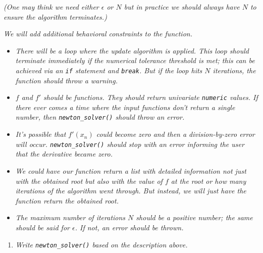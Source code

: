 \documentclass[
]{article}
\providecommand{\tightlist}{%
  \setlength{\itemsep}{0pt}\setlength{\parskip}{0pt}}
\begin{document}
\emph{(One may think we need either \(\epsilon\) or \(N\) but in
practice we should always have \(N\) to ensure the algorithm
terminates.)}

\emph{We will add additional behavioral constraints to the function.}

\begin{itemize}
\tightlist
\item
  \emph{There will be a loop where the update algorithm is applied. This
  loop should terminate immediately if the numerical tolerance threshold
  is met; this can be achieved via an \texttt{if} statement and
  \texttt{break}. But if the loop hits \(N\) iterations, the function
  should throw a warning.}
\item
  \emph{\(f\) and \(f'\) should be functions. They should return
  univariate \texttt{numeric} values. If there ever comes a time where
  the input functions don't return a single number, then
  \texttt{newton\_solver()} should throw an error.}
\item
  \emph{It's possible that \(f'(x_n)\) could become zero and then a
  division-by-zero error will occur. \texttt{newton\_solver()} should
  stop with an error informing the user that the derivative became
  zero.}
\item
  \emph{We could have our function return a list with detailed
  information not just with the obtained root but also with the value of
  \(f\) at the root or how many iterations of the algorithm went
  through. But instead, we will just have the function return the
  obtained root.}
\item
  \emph{The maximum number of iterations \(N\) should be a positive
  number; the same should be said for \(\epsilon\). If not, an error
  should be thrown.}
\end{itemize}

\begin{enumerate}
\def\labelenumi{\arabic{enumi}.}
\tightlist
\item
  \emph{Write \texttt{newton\_solver()} based on the description above.}
\end{enumerate}
\end{document}

